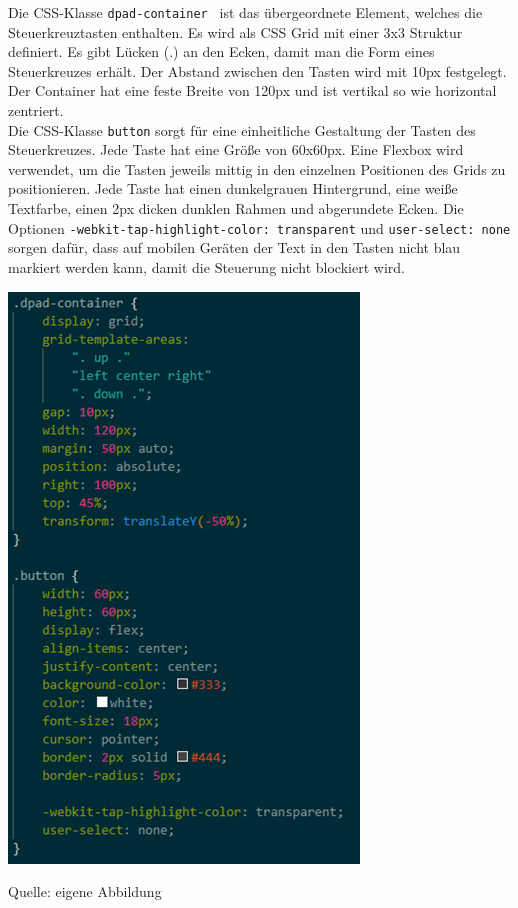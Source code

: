 \documentclass[ngerman,12pt,a4paper]{article}
\begin{document}
	Die CSS-Klasse \texttt{dpad-container } ist das übergeordnete Element, welches die Steuerkreuztasten enthalten. Es wird als CSS Grid mit einer 3x3 Struktur definiert. Es gibt Lücken (.) an den Ecken, damit man die Form eines Steuerkreuzes erhält. Der Abstand zwischen den Tasten wird mit 10px festgelegt. Der Container hat eine feste Breite von 120px und ist vertikal so wie horizontal zentriert. \\[0.5cm]
	Die CSS-Klasse \texttt{button} sorgt für eine einheitliche Gestaltung der Tasten des Steuerkreuzes. Jede Taste hat eine Größe von 60x60px. Eine Flexbox wird verwendet, um die Tasten jeweils mittig in den einzelnen Positionen des Grids zu positionieren. Jede Taste hat einen dunkelgrauen Hintergrund, eine weiße Textfarbe, einen 2px dicken dunklen Rahmen und abgerundete Ecken. Die Optionen \texttt{-webkit-tap-highlight-color: transparent} und \texttt{user-select: none} sorgen dafür, dass auf mobilen Geräten der Text in den Tasten nicht blau markiert werden kann, damit die Steuerung nicht blockiert wird. 
	\begin{center}
		\begin{minipage}[t]{0.55\textwidth}
			\includegraphics[scale=0.9]{Pictures/Steuerung-css1}
			\label{fig:Steuerkreuz-css1}
			\vspace{-10pt}
			\begin{center}
				\par\small Quelle: eigene Abbildung 
			\end{center}
		\end{minipage} \\[0.75cm]
	\end{center}
\end{document}
